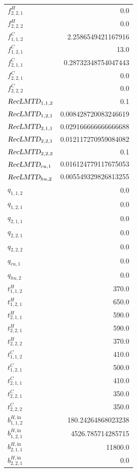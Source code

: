 \documentclass{article}%
\begin{document}
\begin{multicols*}{3}
\begin{supertabular}{lr}
	$f_{2,2,1}^{H}$ & 0.0 \\%
	$f_{2,2,2}^{H}$ & 0.0 \\%
	$f_{1,1,2}^{C}$ & 2.2586549421167916 \\%
	$f_{1,2,1}^{C}$ & 13.0 \\%
	$f_{2,1,1}^{C}$ & 0.28732348754047443 \\%
	$f_{2,2,1}^{C}$ & 0.0 \\%
	$f_{2,2,2}^{C}$ & 0.0 \\%
	$\textsl{RecLMTD}_{1,1,2}$ & 0.1 \\%
	$\textsl{RecLMTD}_{1,2,1}$ & 0.008428720083246619 \\%
	$\textsl{RecLMTD}_{2,1,1}$ & 0.029166666666666688 \\%
	$\textsl{RecLMTD}_{2,2,1}$ & 0.012117270959084082 \\%
	$\textsl{RecLMTD}_{2,2,2}$ & 0.1 \\%
	$\textsl{RecLMTD}_{cu,1}$ & 0.016124779117675053 \\%
	$\textsl{RecLMTD}_{hu,2}$ & 0.005549329826813255 \\%
	$q_{1,1,2}$ & 0.0 \\%
	$q_{1,2,1}$ & 0.0 \\%
	$q_{2,1,1}$ & 0.0 \\%
	$q_{2,2,1}$ & 0.0 \\%
	$q_{2,2,2}$ & 0.0 \\%
	$q_{cu,1}$ & 0.0 \\%
	$q_{hu,2}$ & 0.0 \\%
	$t_{1,1,2}^{H}$ & 370.0 \\%
	$t_{1,2,1}^{H}$ & 650.0 \\%
	$t_{2,1,1}^{H}$ & 590.0 \\%
	$t_{2,2,1}^{H}$ & 590.0 \\%
	$t_{2,2,2}^{H}$ & 370.0 \\%
	$t_{1,1,2}^{C}$ & 410.0 \\%
	$t_{1,2,1}^{C}$ & 500.0 \\%
	$t_{2,1,1}^{C}$ & 410.0 \\%
	$t_{2,2,1}^{C}$ & 350.0 \\%
	$t_{2,2,2}^{C}$ & 350.0 \\%
	$b_{1,1,2}^{H,\text{in}}$ & 180.24264868023238 \\%
	$b_{1,2,1}^{H,\text{in}}$ & 4526.785714285715 \\%
	$b_{2,1,1}^{H,\text{in}}$ & 11800.0 \\%
	$b_{2,2,1}^{H,\text{in}}$ & 0.0 \\%

\end{supertabular}
\end{multicols*}
\end{document}
